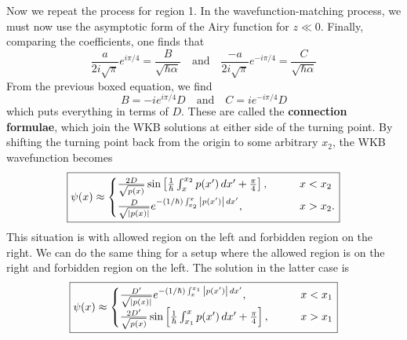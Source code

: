 \documentclass{book}
\theoremstyle{definition}
\newcommand{\al}{\alpha}
\newcommand{\f}[2]{\frac{#1}{#2}}
\newcommand{\lb}{\left[}
\newcommand{\rb}{\right]}
\begin{document}
Now we repeat the process for region 1. In the wavefunction-matching process, we must now use the asymptotic form of the Airy function for $z\ll 0$. Finally, comparing the coefficients, one finds that
\begin{equation*}
\boxed{\f{a}{2i\sqrt{\pi} }e^{i\pi /4}  = \f{B}{\sqrt{\hbar \al}} \quad \text{and} \quad \f{-a}{2i \sqrt{\pi}}e^{-i\pi /4} =  \f{C}{\sqrt{\hbar \al}}}
\end{equation*}
From the previous boxed equation, we find 
\begin{equation*}
\boxed{B = -ie^{i\pi/4} D \quad \text{and} \quad C = ie^{-i\pi /4} D} 
\end{equation*}
which puts everything in terms of $D$. These are called the \textbf{connection formulae}, which join the WKB solutions at either side of the turning point. By shifting the turning point back from the origin to some arbitrary $x_2$, the WKB wavefunction becomes
\begin{align*}
\boxed{
\psi(x) \approx 
\begin{cases}
\f{2D}{\sqrt{p(x)}} \sin\lb \f{1}{\hbar} \int_x^{x_2} p(x')\,dx' + \f{\pi}{4} \rb, &\quad\quad x < x_2\\
\f{D}{\sqrt{\abs{p(x)}}} e^{-(1/\hbar) \int_{x_2}^x \abs{p(x')}\,dx'}, &\quad\quad x > x_2.
\end{cases}}
\end{align*}
This situation is with allowed region on the left and forbidden region on the right. We can do the same thing for a setup where the allowed region is on the right and forbidden region on the left. The solution in the latter case is 
\begin{align*}
\boxed{
	\psi(x) \approx 
	\begin{cases}
	\f{D'}{\sqrt{\abs{p(x)}}} e^{-(1/\hbar) \int_{x}^{x_1} \abs{p(x')}\,dx'}, &\quad\quad x < x_1\\
	\f{2D'}{\sqrt{p(x)}} \sin\lb \f{1}{\hbar} \int_{x_1}^{x} p(x')\,dx' + \f{\pi}{4} \rb, &\quad\quad x > x_1
	\end{cases}}
\end{align*}
\end{document}
